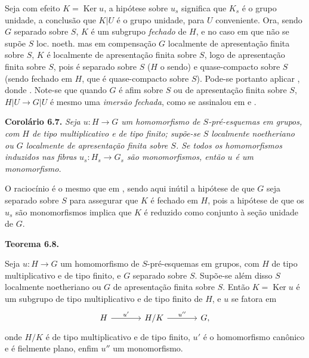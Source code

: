 Seja com efeito \(K=\operatorname{Ker}u\), a hipótese
sobre \(u_s\) significa que \(K_s\) é o grupo unidade,
a conclusão que \(K|U\) é o grupo unidade, para \(U\)
conveniente. Ora, sendo \(G\) separado sobre \(S\), \(K\)
é um subgrupo \emph{fechado} de \(H\), e no caso em que
não se supõe \(S\) loc. noeth. mas em compensação \(G\)
localmente de apresentação finita sobre \(S\), \(K\) é
localmente de apresentação finita sobre \(S\), logo de
apresentação finita sobre \(S\), pois é separado sobre
\(S\) (\(H\) o sendo) e quase-compacto sobre \(S\) (sendo
fechado em \(H\), que é quase-compacto sobre \(S\)).
Pode-se portanto aplicar
, donde
.
%
Note-se que quando \(G\) é afim sobre \(S\) ou de
apresentação finita sobre \(S\), \(H|U\to G|U\) é mesmo
uma \emph{imersão fechada}, como se assinalou em
 e
.

\medskip
\noindent{}\textbf{Corolário 6.7.}
\textit{Seja \(u:H\to G\) um homomorfismo de
\(S\)-pré-esquemas em grupos, com \(H\) de tipo
multiplicativo e de tipo finito; supõe-se \(S\) localmente
noetheriano ou \(G\) localmente de apresentação finita
sobre \(S\). Se todos os homomorfismos induzidos nas fibras
\(u_s:H_s\to G_s\) são monomorfismos, então \(u\) é um
monomorfismo.}

O raciocínio é o mesmo que em
, sendo aqui inútil
a hipótese de que \(G\) seja separado sobre \(S\) para
assegurar que \(K\) é fechado em \(H\), pois a hipótese
de que os \(u_s\) são monomorfismos implica que \(K\)
é reduzido como conjunto à seção unidade de \(G\).

\medskip
\noindent{}\textbf{Teorema 6.8.}
\begin{itshape}
Seja \(u:H\to G\) um homomorfismo de \(S\)-pré-esquemas em
grupos, com \(H\) de tipo multiplicativo e de tipo finito,
e \(G\) separado sobre \(S\). Supõe-se além disso \(S\)
localmente noetheriano ou \(G\) de apresentação finita
sobre \(S\). Então \(K=\operatorname{Ker}u\) é um subgrupo
de tipo multiplicativo e de tipo finito de \(H\), e \(u\)
se fatora em
\[
\begin{tikzcd}[column sep=large]
  H \arrow[r,"u'"] & H/K \arrow[r,"u''"] & G,
\end{tikzcd}
\]
onde \(H/K\) é de tipo multiplicativo e de tipo finito,
\(u'\) é o homomorfismo canônico e é fielmente plano,
enfim \(u''\) um monomorfismo.
\end{itshape}

